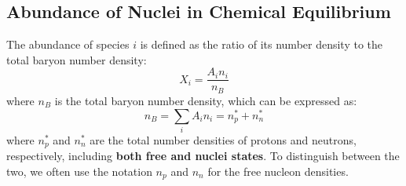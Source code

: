 \clearpage
\subsection{Abundance of Nuclei in Chemical Equilibrium}
\begin{theory}
    The abundance of species $i$ is defined as the ratio of its number density to the total baryon number density:
    \[
        X_i = \frac{A_i n_i}{n_B}
    \]
    where $n_B$ is the total baryon number density, which can be expressed as:
    \[
        n_B = \sum_i A_i n_i = n^{*}_p + n^{*}_n
    \]
    where $n^{*}_p$ and $n^{*}_n$ are the total number densities of protons and neutrons, respectively, including \textbf{both free and nuclei states}. To distinguish between the two, we often use the notation $n_p$ and $n_n$ for the free nucleon densities. \\
\end{theory}

